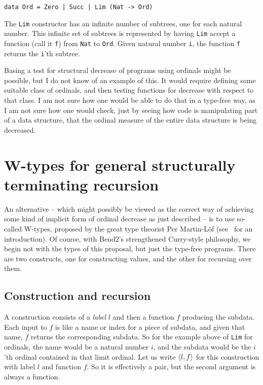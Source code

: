 \documentclass{article}
\begin{document}
\begin{verbatim}
data Ord = Zero | Succ | Lim (Nat -> Ord)
\end{verbatim}

\noindent The \verb|Lim| constructor has an infinite number of
subtrees, one for each natural number.  This infinite set of subtrees
is represented by having \verb|Lim| accept a function (call it
\verb|f|) from \verb|Nat| to \verb|Ord|.  Given natural number
\verb|i|, the function \verb|f| returns the \verb|i|'th subtree.

Basing a test for structural decrease of programs using ordinals might
be possible, but I do not know of an example of this.  It would
require defining some suitable class of ordinals, and then testing
functions for decrease with respect to that class.  I am not sure how
one would be able to do that in a type-free way, as I am not sure how
one would check, just by seeing how code is manipulating part of a
data structure, that the ordinal measure of the entire data structure
is being decreased.

\section{W-types for general structurally terminating recursion}

An alternative -- which might possibly be viewed as the correct way of
achieving some kind of implicit form of ordinal decrease as just
described -- is to use so-called W-types, proposed by the great type
theorist Per Martin-L\"of (see~\cite[Chapter 15]{mlttprog} for an
introduction).  Of course, with Bend2's strengthened Curry-style
philosophy, we begin not with the types of this proposal, but just the
type-free programs.  There are two constructs, one for constructing
values, and the other for recursing over them.

\subsection{Construction and recursion}

A construction consists of a \emph{label} $l$ and then a function $f$
producing the subdata.  Each input to $f$ is like a name or index for
a piece of subdata, and given that name, $f$ returns the corresponding
subdata.  So for the example above of \verb|Lim| for ordinals, the
name would be a natural number $i$, and the subdata would be the
$i$'th ordinal contained in that limit ordinal.  Let us write
$\langle l , f \rangle$ for this construction with label $l$ and function $f$.
So it is effectively a pair, but the second argument is always a
function.
\end{document}
